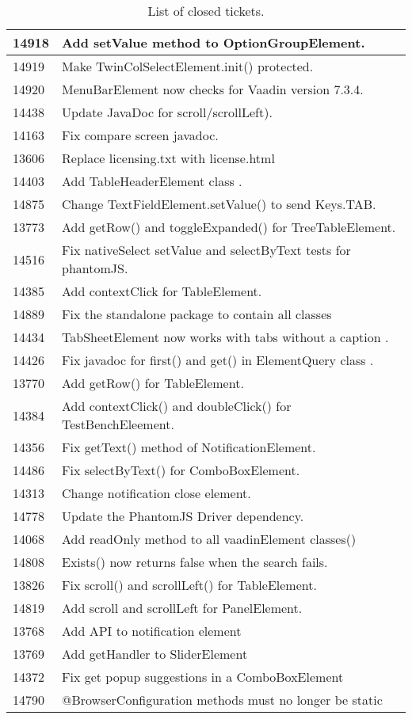 \begin{table}
\begin{tabular}{|l|l|}
	14918 & Add setValue method to OptionGroupElement.\\ \hline
	14919 & Make TwinColSelectElement.init() protected.\\ \hline
	14920 & MenuBarElement now checks for Vaadin version 7.3.4.\\ \hline
	14438 & Update JavaDoc for scroll/scrollLeft).\\ \hline
	14163 & Fix compare screen javadoc.\\ \hline
	13606 & Replace licensing.txt with license.html \\ \hline
	14403 & Add TableHeaderElement class .\\ \hline
	14875 & Change TextFieldElement.setValue() to send Keys.TAB.\\ \hline
	13773 & Add getRow() and toggleExpanded() for TreeTableElement.\\ \hline
	14516 & Fix nativeSelect setValue and selectByText tests for phantomJS.\\ \hline
	14385 & Add contextClick for TableElement.\\ \hline
	14889 & Fix the standalone package to contain all classes\\ \hline
	14434 & TabSheetElement now works with tabs without a caption .\\ \hline
	14426 & Fix javadoc for first() and get() in ElementQuery class .\\ \hline
	13770 & Add getRow() for TableElement.\\ \hline
	14384 & Add contextClick() and doubleClick() for TestBenchEleement.\\ \hline
	14356 & Fix getText() method of NotificationElement.\\ \hline
	14486 & Fix selectByText() for ComboBoxElement.\\ \hline
	14313 & Change notification close element.\\ \hline
	14778 & Update the PhantomJS Driver dependency.\\ \hline
	14068 & Add readOnly method to all vaadinElement classes()\\ \hline
	14808 & Exists() now returns false when the search fails.\\ \hline
	13826 & Fix scroll() and scrollLeft() for TableElement.\\ \hline
	14819 & Add scroll and scrollLeft for PanelElement.\\ \hline
	13768 & Add API to notification element\\ \hline
	13769 & Add getHandler to SliderElement\\ \hline
	14372 & Fix get popup suggestions in a ComboBoxElement\\ \hline
	14790 & @BrowserConfiguration methods must no longer be static\\ \hline
	\end{tabular}
	\caption{List of closed tickets.}
	\label{table:tickets}
\end{table}